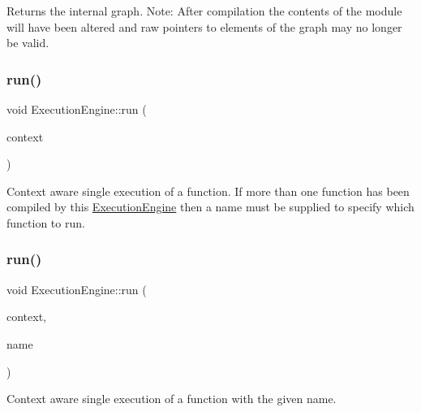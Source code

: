 \begin{DoxyReturn}{Returns}
the internal graph. Note\+: After compilation the contents of the module will have been altered and raw pointers to elements of the graph may no longer be valid. 
\end{DoxyReturn}
\mbox{\label{classglow_1_1_execution_engine_ac923edda3691d2560632616145c3175f}} 
\subsubsection{\texorpdfstring{run()}{run()}\hspace{0.1cm}{\footnotesize\ttfamily [1/4]}}
{\footnotesize\ttfamily void Execution\+Engine\+::run (\begin{DoxyParamCaption}\item[{\hyperlink{classglow_1_1_execution_context}{Execution\+Context} \&}]{context }\end{DoxyParamCaption})}

Context aware single execution of a function. If more than one function has been compiled by this \hyperlink{classglow_1_1_execution_engine}{Execution\+Engine} then a name must be supplied to specify which function to run. \mbox{\label{classglow_1_1_execution_engine_a52453e762a5843e7727cdb83c32422ee}} 
\subsubsection{\texorpdfstring{run()}{run()}\hspace{0.1cm}{\footnotesize\ttfamily [2/4]}}
{\footnotesize\ttfamily void Execution\+Engine\+::run (\begin{DoxyParamCaption}\item[{\hyperlink{classglow_1_1_execution_context}{Execution\+Context} \&}]{context,  }\item[{llvm\+::\+String\+Ref}]{name }\end{DoxyParamCaption})}

Context aware single execution of a function with the given {\ttfamily name}. \mbox{\label{classglow_1_1_execution_engine_a4d13189ef64dea65a581caf4a9b88978}} 

